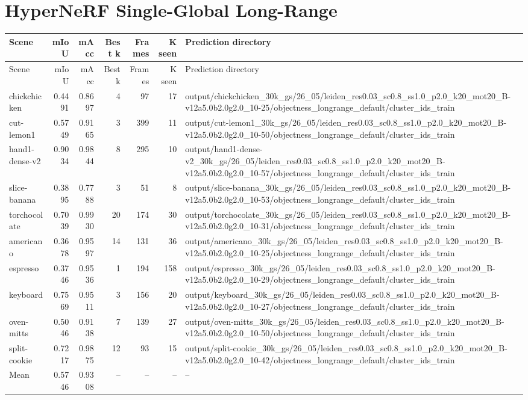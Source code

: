 \documentclass[10pt]{article}
\begin{document}
\section{HyperNeRF Single-Global Long-Range}
\small
\begin{longtable}{lrrrrrp{12cm}}
\toprule
Scene & mIoU & mAcc & Best k & Frames & K seen & Prediction directory \\
\midrule
\endfirsthead
\toprule
Scene & mIoU & mAcc & Best k & Frames & K seen & Prediction directory \\
\midrule
\endhead
chickchicken & 0.4491 & 0.8697 & 4 & 97 & 17 & output/chickchicken\_30k\_gs/26\_05/leiden\_res0.03\_sc0.8\_ss1.0\_p2.0\_k20\_mot20\_B-v12a5.0b2.0g2.0\_10-25/objectness\_longrange\_default/cluster\_ids\_train \\
cut-lemon1 & 0.5749 & 0.9165 & 3 & 399 & 11 & output/cut-lemon1\_30k\_gs/26\_05/leiden\_res0.03\_sc0.8\_ss1.0\_p2.0\_k20\_mot20\_B-v12a5.0b2.0g2.0\_10-50/objectness\_longrange\_default/cluster\_ids\_train \\
hand1-dense-v2 & 0.9034 & 0.9844 & 8 & 295 & 10 & output/hand1-dense-v2\_30k\_gs/26\_05/leiden\_res0.03\_sc0.8\_ss1.0\_p2.0\_k20\_mot20\_B-v12a5.0b2.0g2.0\_10-57/objectness\_longrange\_default/cluster\_ids\_train \\
slice-banana & 0.3895 & 0.7788 & 3 & 51 & 8 & output/slice-banana\_30k\_gs/26\_05/leiden\_res0.03\_sc0.8\_ss1.0\_p2.0\_k20\_mot20\_B-v12a5.0b2.0g2.0\_10-53/objectness\_longrange\_default/cluster\_ids\_train \\
torchocolate & 0.7039 & 0.9930 & 20 & 174 & 30 & output/torchocolate\_30k\_gs/26\_05/leiden\_res0.03\_sc0.8\_ss1.0\_p2.0\_k20\_mot20\_B-v12a5.0b2.0g2.0\_10-31/objectness\_longrange\_default/cluster\_ids\_train \\
americano & 0.3678 & 0.9597 & 14 & 131 & 36 & output/americano\_30k\_gs/26\_05/leiden\_res0.03\_sc0.8\_ss1.0\_p2.0\_k20\_mot20\_B-v12a5.0b2.0g2.0\_10-25/objectness\_longrange\_default/cluster\_ids\_train \\
espresso & 0.3746 & 0.9536 & 1 & 194 & 158 & output/espresso\_30k\_gs/26\_05/leiden\_res0.03\_sc0.8\_ss1.0\_p2.0\_k20\_mot20\_B-v12a5.0b2.0g2.0\_10-29/objectness\_longrange\_default/cluster\_ids\_train \\
keyboard & 0.7569 & 0.9511 & 3 & 156 & 20 & output/keyboard\_30k\_gs/26\_05/leiden\_res0.03\_sc0.8\_ss1.0\_p2.0\_k20\_mot20\_B-v12a5.0b2.0g2.0\_10-27/objectness\_longrange\_default/cluster\_ids\_train \\
oven-mitts & 0.5046 & 0.9138 & 7 & 139 & 27 & output/oven-mitts\_30k\_gs/26\_05/leiden\_res0.03\_sc0.8\_ss1.0\_p2.0\_k20\_mot20\_B-v12a5.0b2.0g2.0\_10-50/objectness\_longrange\_default/cluster\_ids\_train \\
split-cookie & 0.7217 & 0.9875 & 12 & 93 & 15 & output/split-cookie\_30k\_gs/26\_05/leiden\_res0.03\_sc0.8\_ss1.0\_p2.0\_k20\_mot20\_B-v12a5.0b2.0g2.0\_10-42/objectness\_longrange\_default/cluster\_ids\_train \\
Mean & 0.5746 & 0.9308 & -- & -- & -- & -- \\
\bottomrule
\end{longtable}
\normalsize
\end{document}
